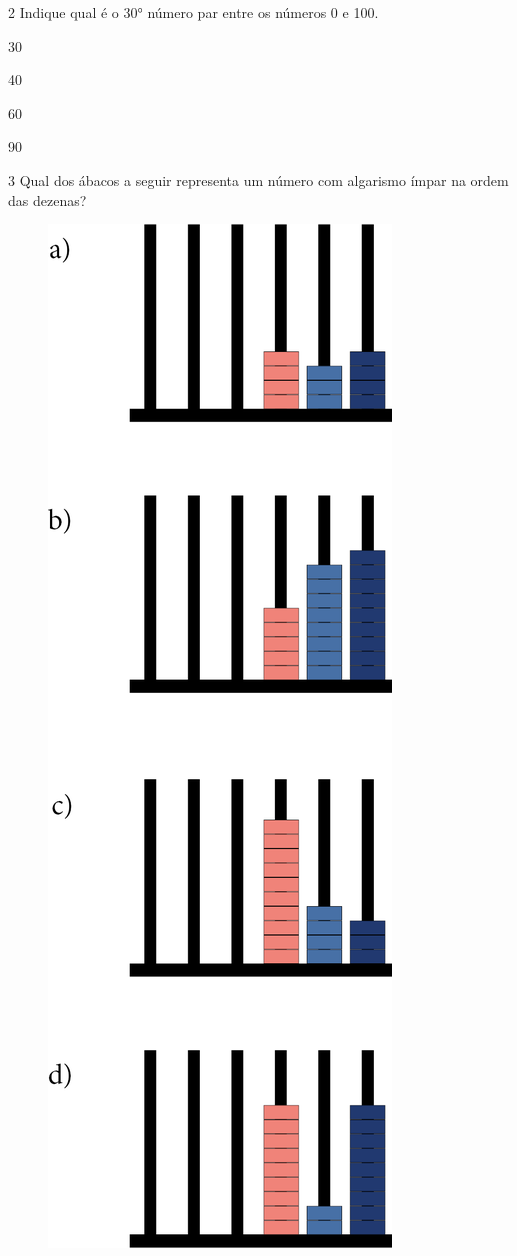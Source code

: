 \num{2} Indique qual é o 30° número par entre os números 0 e 100.

\begin{escolha}[itemsep=-5pt]
\item 30

\item 40

\item 60

\item 90
\end{escolha}

\pagebreak
\num{3} Qual dos ábacos a seguir representa um número com algarismo ímpar na ordem
das dezenas?

\begin{figure}[htpb!]
\includegraphics[scale=1]{./media/image16.png}
\end{figure}

